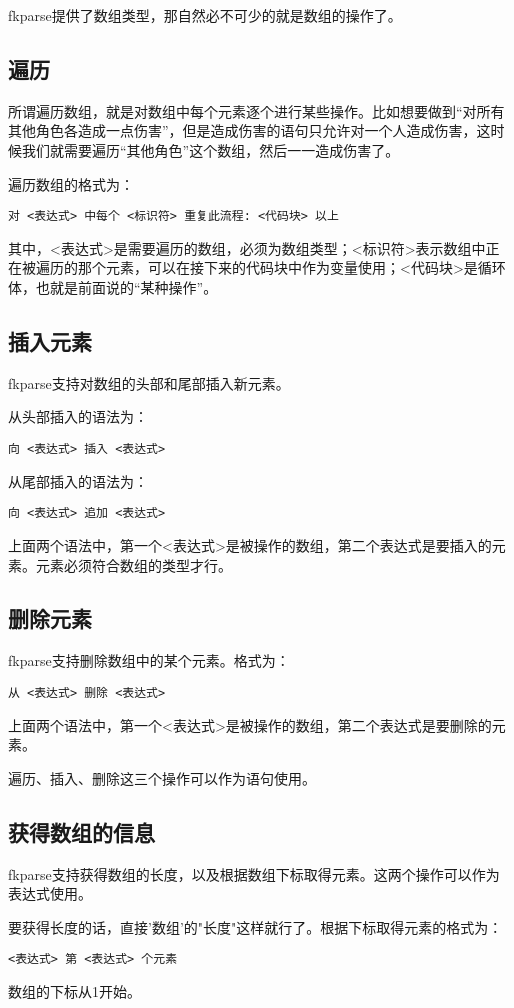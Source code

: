 fkparse提供了数组类型，那自然必不可少的就是数组的操作了。

\subsection{遍历}

所谓遍历数组，就是对数组中每个元素逐个进行某些操作。比如想要做到“对所有其他角色各造成一点伤害”，但是造成伤害的语句只允许对一个人造成伤害，这时候我们就需要遍历“其他角色”这个数组，然后一一造成伤害了。

遍历数组的格式为：

\begin{verbatim}
对 <表达式> 中每个 <标识符> 重复此流程: <代码块> 以上
\end{verbatim}

其中，<表达式>是需要遍历的数组，必须为数组类型；<标识符>表示数组中正在被遍历的那个元素，可以在接下来的代码块中作为变量使用；<代码块>是循环体，也就是前面说的“某种操作”。

\subsection{插入元素}

fkparse支持对数组的头部和尾部插入新元素。

从头部插入的语法为：

\begin{verbatim}
向 <表达式> 插入 <表达式>
\end{verbatim}

从尾部插入的语法为：

\begin{verbatim}
向 <表达式> 追加 <表达式>
\end{verbatim}

上面两个语法中，第一个<表达式>是被操作的数组，第二个表达式是要插入的元素。元素必须符合数组的类型才行。

\subsection{删除元素}

fkparse支持删除数组中的某个元素。格式为：

\begin{verbatim}
从 <表达式> 删除 <表达式>
\end{verbatim}

上面两个语法中，第一个<表达式>是被操作的数组，第二个表达式是要删除的元素。

遍历、插入、删除这三个操作可以作为语句使用。

\subsection{获得数组的信息}

fkparse支持获得数组的长度，以及根据数组下标取得元素。这两个操作可以作为表达式使用。

要获得长度的话，直接'数组'的"长度"这样就行了。根据下标取得元素的格式为：

\begin{verbatim}
<表达式> 第 <表达式> 个元素
\end{verbatim}

数组的下标从1开始。

